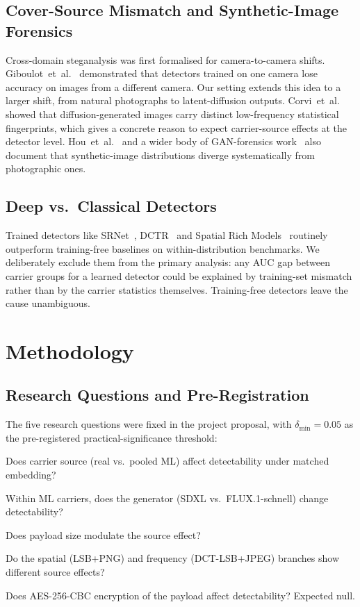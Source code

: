 \documentclass[10pt,twocolumn,a4paper]{article}
\begin{document}
\subsection{Cover-Source Mismatch and Synthetic-Image Forensics}
Cross-domain steganalysis was first formalised for camera-to-camera shifts. Giboulot~et~al.~\cite{giboulot2020csm} demonstrated that detectors trained on one camera lose accuracy on images from a different camera. Our setting extends this idea to a larger shift, from natural photographs to latent-diffusion outputs. Corvi~et~al.~\cite{corvi2023diffusion} showed that diffusion-generated images carry distinct low-frequency statistical fingerprints, which gives a concrete reason to expect carrier-source effects at the detector level. Hou~et~al.~\cite{hou2021gan} and a wider body of GAN-forensics work~\cite{rossler2019fake} also document that synthetic-image distributions diverge systematically from photographic ones.

\subsection{Deep vs.\ Classical Detectors}
Trained detectors like SRNet~\cite{boroumand2019srnet}, DCTR~\cite{holub2015dctr} and Spatial Rich Models~\cite{fridrich2012srm} routinely outperform training-free baselines on within-distribution benchmarks. We deliberately exclude them from the primary analysis: any AUC gap between carrier groups for a learned detector could be explained by training-set mismatch rather than by the carrier statistics themselves. Training-free detectors leave the cause unambiguous.

\section{Methodology}
\label{sec:methods}

\subsection{Research Questions and Pre-Registration}
The five research questions were fixed in the project proposal, with $\delta_\text{min}\!=\!0.05$ as the pre-registered practical-significance threshold:
\begin{description}[font=\bfseries,leftmargin=1.2em,style=nextline,itemsep=2pt]
\item[RQ1 (primary, confirmatory)] Does carrier source (real vs.\ pooled ML) affect detectability under matched embedding?
\item[RQ2 (primary, confirmatory)] Within ML carriers, does the generator (SDXL vs.\ FLUX.1-schnell) change detectability?
\item[RQ3 (exploratory)] Does payload size modulate the source effect?
\item[RQ4 (exploratory)] Do the spatial (LSB+PNG) and frequency (DCT-LSB+JPEG) branches show different source effects?
\item[RQ5 (verification)] Does AES-256-CBC encryption of the payload affect detectability? Expected null.
\end{description}
\end{document}
